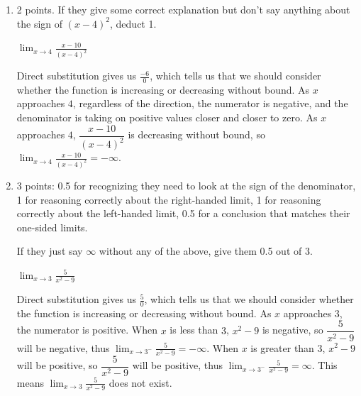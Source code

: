 \documentclass{article}
\begin{document}
\begin{enumerate}
\begin{enumerate}
    \begin{solution}
      Direct substitution gives us $\frac{0}{36}=0$, so 
      $\displaystyle \lim_{x \to 10} \frac{x - 10}{(x - 4)^2} = 0.$
    \end{solution}

  \item \label{evaluate-limits-1-nonzero/0-1}

    \begin{grading}
      2 points. If they give some correct explanation but don't say anything about the sign of $(x - 4)^2$, deduct 1.
    \end{grading}

    \begin{problem}[\nstretch{1.5}]
      $\displaystyle \lim_{x \to 4} \frac{x - 10}{(x - 4)^2}$
    \end{problem}

    \begin{solution}
      Direct substitution gives us $\frac{-6}{0}$, which tells us that we should consider whether the function is 
      increasing or decreasing without bound. As $x$ approaches $4$, regardless of the direction,
      the numerator is negative, and the denominator
      is taking on positive values closer and closer to zero.
      As $x$ approaches $4$, $\dfrac{x - 10}{(x - 4)^2}$ is decreasing without bound, 
      so $\displaystyle \lim_{x \to 4} \frac{x - 10}{(x - 4)^2}=-\infty.$
    \end{solution}

  \item

    \begin{grading}
      3 points: 0.5 for recognizing they need to look at the sign of the denominator, 1 for reasoning correctly about the right-handed limit, 1 for reasoning correctly about the left-handed limit, 0.5 for a conclusion that matches their one-sided limits.

      If they just say $\infty$ without any of the above, give them 0.5 out of 3. 
    \end{grading}

    \begin{problem}[\vfill]
      $\displaystyle \lim_{x \to 3} \frac{5}{x^2 - 9}$
    \end{problem}

    \begin{solution}
      Direct substitution gives us $\frac{5}{0}$, which tells us that we should consider whether the function
      is increasing or decreasing without bound. As $x$ approaches $3$, the numerator is positive. When $x$ is
      less than $3$, $x^2-9$ is negative, so $\dfrac{5}{x^2-9}$ will be negative, thus
      $\displaystyle \lim_{x \to 3^-} \frac{5}{x^2-9} = -\infty$. When $x$ is greater than $3$, $x^2-9$ will be
      positive, so $\dfrac{5}{x^2-9}$ will be positive, 
      thus $\displaystyle \lim_{x \to 3^-} \frac{5}{x^2-9} = \infty$.
      This means $\displaystyle \lim_{x \to 3} \frac{5}{x^2-9}$ does not exist.
    \end{solution}


\end{enumerate}
\end{enumerate}
\end{document}
